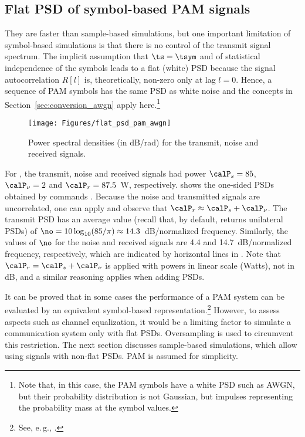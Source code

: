 \subsection{Flat PSD of symbol-based PAM signals}

They are faster than sample-based simulations, but one important limitation of symbol-based simulations is that there is no control of the transmit signal spectrum. The implicit assumption that $\ts = \tsym$ and of statistical independence of the symbols leads to a flat (white) PSD because the signal autocorrelation $R[l]$ is, theoretically, non-zero only at lag $l=0$. Hence, a sequence of PAM symbols has the same PSD as white noise and the concepts in Section~\ref{sec:conversion_awgn} apply here.\footnote{Note that, in this case, the PAM symbols have a white PSD such as AWGN, but their probability distribution is not Gaussian, but impulses representing the probability mass at the symbol values.}

\begin{figure}[htbp]
\centering
\texttt{[image: Figures/flat\_psd\_pam\_awgn]}
\caption{Power spectral densities (in dB/rad) for the transmit, noise and received signals.\label{fig:flat_psd_pam_awgn}}
\end{figure}

For , the transmit, noise and received signals had power $\calP_s = 85$, $\calP_{\nu} = 2$ and $\calP_r = 87.5$~W, respectively.  shows the one-sided PSDs obtained by commands .
 Because the noise and transmitted signals are uncorrelated, one can apply  and observe that $\calP_r \approx \calP_s + \calP_{\nu}$.
The transmit PSD has an average value (recall that, by default,  returns unilateral PSDs) of $\no = 10 \log_{10} (85 / \pi) \approx 14.3$~dB/normalized frequency. Similarly, the values of $\no$ for the noise and received signals are 4.4 and 14.7~dB/normalized frequency, respectively, which are indicated by horizontal lines in . Note that 
$\calP_r  = \calP_s + \calP_{\nu}$ is applied with powers in linear scale (Watts), not in dB, and a similar reasoning applies when adding PSDs.

It can be proved that in some cases the performance of a PAM system can be evaluated by an equivalent symbol-based representation.\footnote{See, e.\,g., \cite{Ciofficn,Proakis07}.}
However, to assess aspects such as channel equalization, it would be a limiting factor to simulate a communication system only with flat PSDs. Oversampling is used to circumvent this restriction.
The next section discusses sample-based simulations, which allow using signals with non-flat PSDs. PAM is assumed for simplicity.


